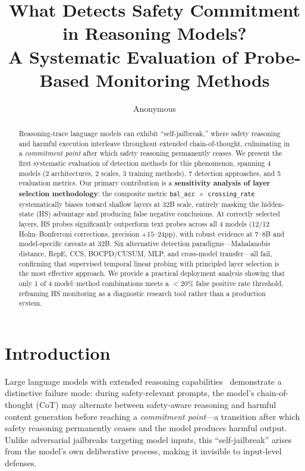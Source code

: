 \documentclass[11pt,a4paper]{article}
\title{What Detects Safety Commitment in Reasoning Models?\\A Systematic Evaluation of Probe-Based Monitoring Methods}
\author{Anonymous}
\newcommand{\pp}{\text{pp}}
\begin{document}
\maketitle

\begin{abstract}
Reasoning-trace language models can exhibit ``self-jailbreak,'' where safety reasoning and harmful execution interleave throughout extended chain-of-thought, culminating in a \emph{commitment point} after which safety reasoning permanently ceases.
We present the first systematic evaluation of detection methods for this phenomenon, spanning 4 models (2 architectures, 2 scales, 3 training methods), 7 detection approaches, and 5 evaluation metrics.
Our primary contribution is a \textbf{sensitivity analysis of layer selection methodology}: the composite metric \texttt{bal\_acc $\times$ crossing\_rate} systematically biases toward shallow layers at 32B scale, entirely masking the hidden-state (HS) advantage and producing false negative conclusions.
At correctly selected layers, HS probes significantly outperform text probes across all 4 models (12/12 Holm--Bonferroni corrections, precision $+15$--$24\pp$), with robust evidence at 7--8B and model-specific caveats at 32B.
Six alternative detection paradigms---Mahalanobis distance, RepE, CCS, BOCPD/CUSUM, MLP, and cross-model transfer---all fail, confirming that supervised temporal linear probing with principled layer selection is the most effective approach.
We provide a practical deployment analysis showing that only 1 of 4 model--method combinations meets a $<$20\% false positive rate threshold, reframing HS monitoring as a diagnostic research tool rather than a production system.
\end{abstract}

\section{Introduction}

Large language models with extended reasoning capabilities~\cite{deepseek-r1,qwq-32b} demonstrate a distinctive failure mode: during safety-relevant prompts, the model's chain-of-thought (CoT) may alternate between safety-aware reasoning and harmful content generation before reaching a \emph{commitment point}---a transition after which safety reasoning permanently ceases and the model produces harmful output.
Unlike adversarial jailbreaks targeting model inputs, this ``self-jailbreak'' arises from the model's own deliberative process, making it invisible to input-level defenses.
\end{document}
